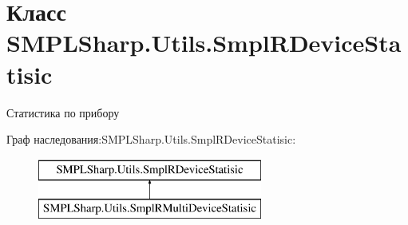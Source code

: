 \hypertarget{class_s_m_p_l_sharp_1_1_utils_1_1_smpl_r_device_statisic}{\section{Класс S\-M\-P\-L\-Sharp.\-Utils.\-Smpl\-R\-Device\-Statisic}
\label{d7/d3b/class_s_m_p_l_sharp_1_1_utils_1_1_smpl_r_device_statisic}
}


Статистика по прибору  


Граф наследования\-:S\-M\-P\-L\-Sharp.\-Utils.\-Smpl\-R\-Device\-Statisic\-:\begin{figure}[H]
\begin{center}
\leavevmode
\includegraphics[height=2.000000cm]{d7/d3b/class_s_m_p_l_sharp_1_1_utils_1_1_smpl_r_device_statisic}
\end{center}
\end{figure}
